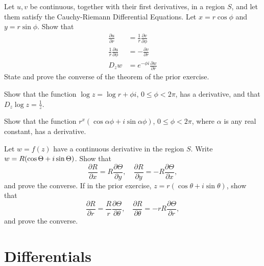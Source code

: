 \documentclass[twosided]{memoir}
\begin{document}
\problem Let $u, v$ be continuous, together with their first derivatives, in a region $S$, and let them satisfy the Cauchy-Riemann Differential Equations. Let $x=r\cos \phi$ and $y=r\sin \phi$. Show that
\begin{align*}
	\frac{\partial u}{\partial r} &= \frac{1}{r} \frac{\partial v}{\partial \phi } \\
	\frac{1}{r}\frac{\partial u}{\partial \phi } &= - \frac{\partial v}{\partial r} \\
	D_zw&=e^{-\phi i}\frac{\partial w}{\partial r} 
\end{align*}
\problem State and prove the converse of the theorem of the prior exercise.

\problem Show that the function $\log z=\log r+\phi i$, $0\le \phi <2\pi $, has a derivative, and that $D_z\log z=\frac{1}{z}$.

\problem Show that the function $r^x(\cos \alpha \phi +i\sin \alpha \phi )$, $0\le \phi <2\pi $, where $\alpha $ is any real constant, has a derivative.

\problem Let $w=f(z)$ have a continuous derivative in the region $S$. Write $w=R\pbr*{\cos \Theta +i\sin \Theta } $. Show that
\[
	\frac{\partial R}{\partial x} =R \frac{\partial \Theta }{\partial y} , \quad \frac{\partial R}{\partial y} =-R \frac{\partial \Theta }{\partial x} 
,\] and prove the converse.
\problem If in the prior exercise, $z=r(\cos \theta +i\sin \theta )$, show that
\[
\frac{\partial R}{\partial r} =\frac{R}{r}\frac{\partial \Theta}{\partial \theta } , \quad \frac{\partial R}{\partial \theta }=-rR \frac{\partial \Theta}{\partial r}  
,\] and prove the converse.

\section{Differentials}
\end{document}
